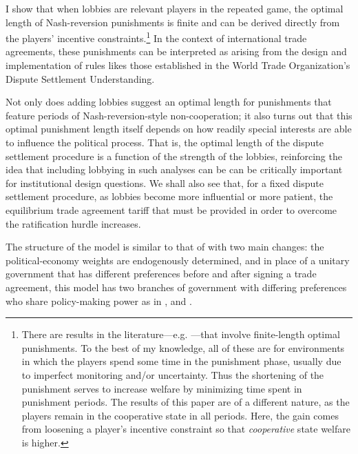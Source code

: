 \documentclass[authoryear, review]{elsarticle}
\begin{document}
I show that when lobbies are relevant players in the repeated game, the optimal length of Nash-reversion punishments is finite and can be derived directly from the players' incentive constraints.\footnote{There are results in the literature---e.g. \citet{greenporter}---that involve finite-length optimal punishments. To the best of my knowledge, all of these are for environments in which the players spend some time in the punishment phase, usually due to imperfect monitoring and/or uncertainty. Thus the shortening of the punishment serves to increase welfare by minimizing time spent in punishment periods. The results of this paper are of a different nature, as the players remain in the cooperative state in all periods. Here, the gain comes from loosening a player's incentive constraint so that \textit{cooperative} state welfare is higher.} In the context of international trade agreements, these punishments can be interpreted as arising from the design and implementation of rules likes those established in the World Trade Organization's Dispute Settlement Understanding.

Not only does adding lobbies suggest an optimal length for punishments that feature periods of Nash-reversion-style non-cooperation; it also turns out that this optimal punishment length itself depends on how readily special interests are able to influence the political process. That is, the optimal length of the dispute settlement procedure is a function of the strength of the lobbies, reinforcing the idea that including lobbying in such analyses can be can be critically important for institutional design questions. We shall also see that, for a fixed dispute settlement procedure, as lobbies become more influential or more patient, the equilibrium trade agreement tariff that must be provided in order to overcome the ratification hurdle increases. 

The structure of the model is similar to that of \citet{bs2005} with two main changes: the political-economy weights are endogenously determined, and in place of a unitary government that has different preferences before and after signing a trade agreement, this model has two branches of government with differing preferences who share policy-making power as in \citet{mr97}, \citet{song} and \citet{buzard2013b}.
\end{document}
